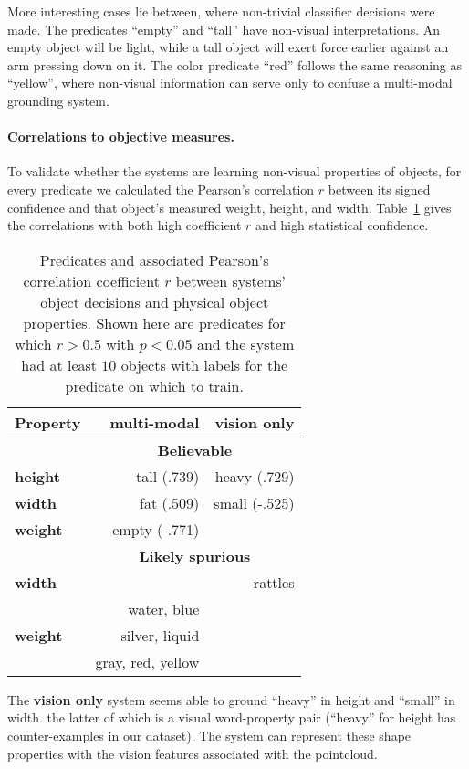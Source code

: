 More interesting cases lie between, where non-trivial classifier decisions were made.
The predicates ``empty'' and ``tall'' have non-visual interpretations.
An empty object will be light, while a tall object will exert force earlier against an arm pressing down on it.
The color predicate ``red'' follows the same reasoning as ``yellow'', where non-visual information can serve only to confuse a multi-modal grounding system.

\paragraph{Correlations to objective measures.}
To validate whether the systems are learning non-visual properties of objects, for every predicate we calculated the Pearson's correlation $r$ between its signed confidence and that object's measured weight, height, and width. Table~\ref{tab:predicate_correlations} gives the correlations with both high coefficient $r$ and high statistical confidence.

\begin{table}
\centering
\begin{tabular}[h]{|l|r|r|}
	\hline
	\bf Property & \bf multi-modal & \bf vision only \\ \hline \hline
	& \multicolumn{2}{c|}{\bf Believable} \\ \hline
	\bf height & tall (.739) & heavy (.729) \\ \hline
	\bf width & fat (.509) & small (-.525) \\ \hline
	\bf weight & empty (-.771) & \\ \hline \hline
	& \multicolumn{2}{c|}{\bf Likely spurious} \\ \hline
	\bf width & & rattles \\ \hline
	& water, blue & \\
	\bf weight & silver, liquid & \\ 
	& gray, red, yellow & \\ \hline

\end{tabular}
\caption{Predicates and associated Pearson's correlation coefficient $r$ between systems' object decisions and physical object properties.
Shown here are predicates for which $r>0.5$ with $p<0.05$ and the system had at least $10$ objects with labels for the predicate on which to train.}
\label{tab:predicate_correlations}
\end{table}

The \textbf{vision only} system seems able to ground ``heavy'' in height and ``small'' in width. the latter of which is a visual word-property pair (``heavy'' for height has counter-examples in our dataset).
The system can represent these shape properties with the vision features associated with the pointcloud.

